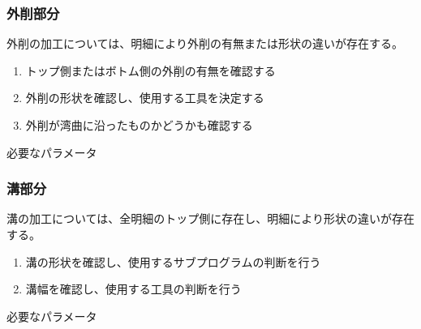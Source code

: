\subsubsection{外削部分}
外削の加工については、明細により外削の有無または形状の違いが存在する。
\begin{enumerate}
\item トップ側またはボトム側の外削の有無を確認する
\item 外削の形状を確認し、使用する工具を決定する
\item {}外削が湾曲に沿ったものかどうかも確認する
\end{enumerate}
\begin{Parameter}{必要なパラメータ}
%
%
%
%
\end{Parameter}

\subsubsection{溝部分}
溝の加工については、全明細のトップ側に存在し、明細により形状の違いが存在する。
\begin{enumerate}
\item {}溝の形状を確認し、使用するサブプログラムの判断を行う
\item {}溝幅を確認し、使用する工具の判断を行う
\end{enumerate}
\begin{Parameter}{必要なパラメータ}
\end{Parameter}

